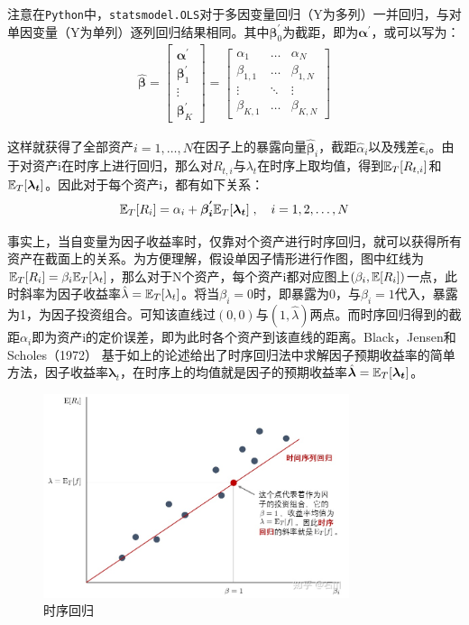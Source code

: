 \documentclass[11pt]{article}
\begin{document}
注意在\verb|Python|中，\verb|statsmodel.OLS|对于多因变量回归（Y为多列）一并回归，与对单因变量（Y为单列）逐列回归结果相同。其中$\bm{\beta}_{0}^{'}$为截距，即为$\bm{\alpha}^{'}$，或可以写为：
\begin{gather*}
    \hat{\bm{\beta}}
    = \begin{bmatrix} \bm{\alpha}^{'} \\ \bm{\beta}_{1}^{'} \\ \vdots \\ \bm{\beta}_{K}^{'} \end{bmatrix}
    = \begin{bmatrix} \alpha_{1} & \dots & \alpha_{N} \\ \beta_{1,1} & \dots & \beta_{1,N} \\ \vdots & \ddots & \vdots \\ \beta_{K,1} & \dots & \beta_{K,N} \end{bmatrix}
\end{gather*}

这样就获得了全部资产$i=1,\dots,N$在因子上的暴露向量$\hat{\bm{\beta}}_i$，截距$\hat{\alpha}_i$以及残差$\hat{\bm{\epsilon}}_i$。由于对资产i在时序上进行回归，那么对$R_{t,i}$与$\lambda_t$在时序上取均值，得到$\mathbb{E}_T[R_{t,i}]$和$\mathbb{E}_T[\bm{\lambda_t}]$。因此对于每个资产i，都有如下关系：
\begin{equation*}
    \mathbb{E}_T[R_i] = \alpha_i + \bm{\beta_{i}^{'}} \mathbb{E}_T[\bm{\lambda_t}] \;,\quad i=1,2,\dots,N
\end{equation*}

事实上，当自变量为因子收益率时，仅靠对个资产进行时序回归，就可以获得所有资产在截面上的关系。为方便理解，假设单因子情形进行作图，图中红线为$\mathbb{E}_T[R_i] = \beta_i \mathbb{E}_T[\lambda_t]$，那么对于N个资产，每个资产i都对应图上$(\beta_i,\mathbb{E}[R_i])$一点，此时斜率为因子收益率$\hat{\lambda}=\mathbb{E}_T[\lambda_t]$。将当$\beta_i=0$时，即暴露为0，与$\beta_i=1$代入，暴露为1，为因子投资组合。可知该直线过$(0,0)$与$(1,\hat{\lambda})$两点。而时序回归得到的截距$\alpha_i$即为资产i的定价误差，即为此时各个资产到该直线的距离。Black，Jensen和Scholes（1972） 基于如上的论述给出了时序回归法中求解因子预期收益率的简单方法，因子收益率$\bm{\lambda}_t$，在时序上的均值就是因子的预期收益率$\hat{\bm{\lambda}} = \mathbb{E}_T[\bm{\lambda_t}]$。

\begin{figure}[H]
    \centering
    \includegraphics[width=0.8\textwidth]{fig/ts_reg.jpg}
    \caption{时序回归}
    \label{fig：ts_reg}
\end{figure}
\end{document}

